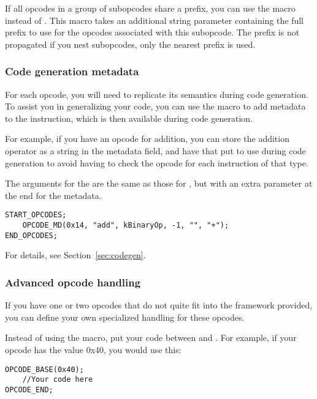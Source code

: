 If all opcodes in a group of subopcodes share a prefix, you can use the  macro instead of . This macro takes an additional string parameter containing the full prefix to use for the opcodes associated with this subopcode. The prefix is not propagated if you nest subopcodes, only the nearest prefix is used.

\subsubsection{Code generation metadata}
For each opcode, you will need to replicate its semantics during code generation. To assist you in generalizing your code, you can use the  macro to add metadata to the instruction, which is then available during code generation.

For example, if you have an opcode for addition, you can store the addition operator as a string in the metadata field, and have that put to use during code generation to avoid having to check the opcode for each instruction of that type.

The arguments for the  are the same as those for , but with an extra parameter at the end for the metadata.

\begin{C++}
\begin{lstlisting}
START_OPCODES;
	OPCODE_MD(0x14, "add", kBinaryOp, -1, "", "+");
END_OPCODES;
\end{lstlisting}
\end{C++}

For details, see Section~\vref{sec:codegen}.

\subsubsection{Advanced opcode handling}
If you have one or two opcodes that do not quite fit into the framework provided, you can define your own specialized handling for these opcodes.

Instead of using the  macro, put your code between  and . For example, if your opcode has the value 0x40, you would use this:

\begin{C++}
\begin{lstlisting}
OPCODE_BASE(0x40);
	//Your code here
OPCODE_END;
\end{lstlisting}
\end{C++}

